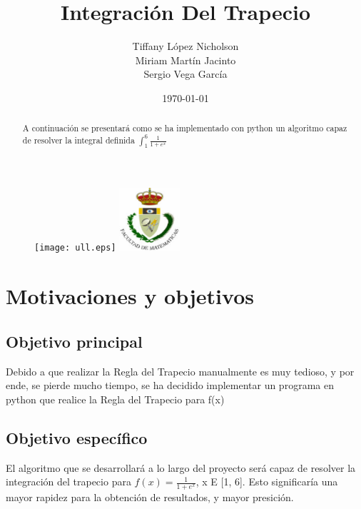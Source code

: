 \documentclass{article}
\begin{document}
  \begin{figure}[t]
    \begin{center}
        \texttt{[image: ull.eps]}
        \hspace{5.5cm}
		\includegraphics[width=0.2\textwidth]{fmatesc.eps}
    \end{center}
  \end{figure}
  \title{Integración Del Trapecio}
  \author{Tiffany López Nicholson \\ Miriam Martín Jacinto \\ Sergio Vega García}
  \date{\today}
  \maketitle

  \begin{abstract}
    \begin{center}
       A continuación se presentará como se ha implementado con python un algoritmo capaz de resolver la integral definida $\int_{1}^{6} \frac{1}{1+e^x}$
    \end{center}
  \end{abstract}
  \pagebreak


  \tableofcontents
  \pagebreak
  
  
  \section{Motivaciones y objetivos}
    \subsection{Objetivo principal}
       Debido a que realizar la Regla del Trapecio manualmente es muy tedioso, y por ende, se pierde mucho tiempo, se ha decidido implementar un programa en python que realice la Regla del Trapecio para f(x)
    \subsection{Objetivo específico} 
       El algoritmo que se desarrollará a lo largo del proyecto será capaz de resolver la integración del trapecio para $ f(x) = \frac{1}{1 + e^{x}}$, x E [1, 6]. Esto significaría una mayor rapidez para la obtención de resultados, y mayor presición.
  \pagebreak
\end{document}
